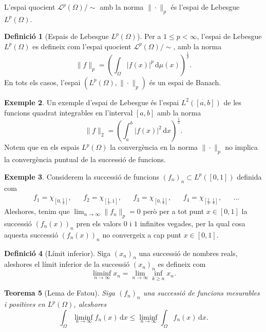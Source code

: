 \documentclass[12pt]{book}
\newtheorem{teorema}{Teorema}[chapter]
\theoremstyle{definition}
\newtheorem{defi}[teorema]{Definició}
\theoremstyle{nota}
\theoremstyle{exemple}
\newtheorem{exemple}[teorema]{Exemple}
\begin{document}
L'espai quocient $\mathcal{L}^p(\Omega)/\sim$ amb la norma
$\|\cdot\|_p$ és l'espai de Lebesgue $L^p(\Omega)$.

\begin{defi}[Espais de Lebesgue $L^p(\Omega)$]
  Per a $1 \leq p < \infty$, l'espai de Lebesgue $L^p(\Omega)$ es
  defineix com l'espai quocient $\mathcal{L}^p(\Omega) / \sim$, amb la
  norma
  \[
    \|f\|_p = \left( \int_\Omega |f(x)|^p \, \mathrm{d}\mu(x)
    \right)^{\frac{1}{p}}.
  \]
  En tots els casos, l'espai $(L^p(\Omega), \|\cdot\|_p)$ és un espai
  de Banach.
\end{defi}

\begin{exemple}
  Un exemple d'espai de Lebesgue és l'espai $L^2([a,b])$ de les
  funcions quadrat integrables en l'interval $[a,b]$ amb la norma
  \[
    \|f\|_2 = \left( \int_a^b |f(x)|^2 \, \mathrm{d}x \right)^{\frac{1}{2}}.
  \]
  Notem que en els espais $L^p(\Omega)$ la convergència en la norma
  $\|\cdot\|_p$ no implica la convergència puntual de la successió de
  funcions.
\end{exemple}

\begin{exemple}
  Considerem la successió de funcions $(f_n)_n \subset L^p([0,1])$
  definida com
  \begin{align*}
    &f_1 = \chi_{\left[0,\frac{1}{2}\right]}, &
    &f_2 = \chi_{\left[\frac{1}{2},1\right]}, &
    &f_3 = \chi_{\left[0,\frac{1}{3}\right]}, &
    &f_4 = \chi_{\left[\frac{1}{2},\frac{1}{4}\right]}, &
    &\dotsc
  \end{align*}
  Aleshores, tenim que $\lim_{n \to \infty} \|f_n\|_p = 0$ però per a
  tot punt $x \in [0,1]$ la successió $(f_n(x))_n$ pren els valors $0$
  i $1$ infinites vegades, per la qual cosa aquesta successió
  $(f_n(x))_n$ no convergeix a cap punt $x \in [0,1]$.
\end{exemple}

\begin{defi}[Límit inferior]
  Siga $(x_n)_n$ una successió de nombres reals, aleshores el límit
  inferior de la successió $(x_n)_n$ es defineix com
  \[
    \liminf_{n \to \infty} x_n = \lim_{n \to \infty} \inf_{k \geq n} x_n.
  \]
\end{defi}

\begin{teorema}[Lema de Fatou]
  Siga $(f_n)_n$ una successió de funcions mesurables i positives en
  $L^p(\Omega)$, aleshores
  \[
    \int_{\Omega} \liminf_{n \to \infty} f_n(x) \, \mathrm{d}x \leq
    \liminf_{n \to \infty} \int_{\Omega} f_n(x) \, \mathrm{d}x.
  \]
\end{teorema}
\end{document}
